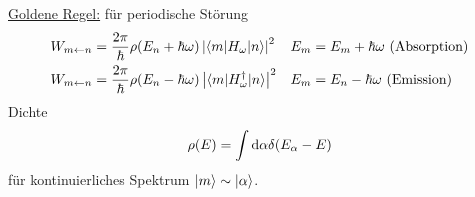 	\underline{Goldene Regel:} für periodische Störung
		\begin{align*} 
			W_{m \leftarrow n} &= 
			\frac{2 \pi}{\hbar} \rho (E_n + \hbar \omega) \left|\braket{m | H_\omega | n}\right|^2 &
			E_m &= E_m + \hbar \omega \text{~(Absorption)} \\
			W_{m \leftarrow n} &= 
			\frac{2 \pi}{\hbar} \rho (E_n - \hbar \omega) \left| \braket{m | H_\omega^\dagger | n}\right|^2 &
			E_m &= E_n - \hbar \omega \text{~(Emission)}
		\end{align*} 
	Dichte
		\begin{align*}
			\rho (E) = \int \mathrm{d} \alpha \delta(E_\alpha - E)
		\end{align*}
	für kontinuierliches Spektrum $\ket{m} \sim \ket{\alpha}$.

